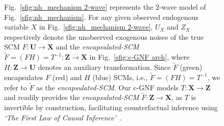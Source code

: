 \documentclass[letterpaper]{article} %
\begin{document}
\begin{figure}[ht!]
{%
Fig.~\ref{sfig:nh_mechanism 2-wave} represents the 2-wave model of Fig.~\ref{sfig:nh_mechanism}.
For any given observed endogenous variable $X$ in Fig.~\ref{sfig:nh_mechanism 2-wave}, $U_X$ and $Z_X$ respectively denote the unobserved exogenous noises of the true SCM $F{ : }\mathbf{U}{ \rightarrow }\mathbf{X}$ and the \emph{encapsulated-SCM} $\tilde{F}{ = }(FH){ = }T^{-1}{ : }\mathbf{Z}{ \rightarrow }\mathbf{X}$ in Fig.~\ref{sfig:c-GNF arch}, where $H{ : }\mathbf{Z}{ \rightarrow }\mathbf{U}$ denotes an auxiliary transformation. Since $\tilde{F}$ (green) encapsulates $F$ (red) and $H$ (blue) SCMs, i.e., $\tilde{F}{ = }(FH){ = }T^{-1}$, we refer to $\tilde{F}$ as the \emph{encapsulated-SCM}.
Our c-GNF models $T{ : }\mathbf{X}{ \rightarrow }\mathbf{Z}$ and readily provides the \emph{encapsulated-SCM} $\tilde{F}{ : }\mathbf{Z}{ \rightarrow }\mathbf{X}$, as $T$ is invertible by construction, facilitating counterfactual inference using \emph{`The First Law of Causal Inference'}~\cite{pearl2009abductionactionprediction, pearl2009causality}.
}
\label{fig:nh_causaC_model all}
\end{figure}
\end{document}
